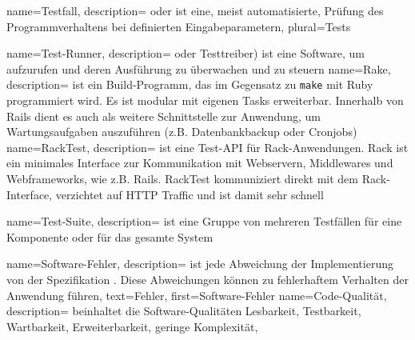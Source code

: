  {
  name={Testfall},
  description= { oder  ist eine, meist automatisierte, Prüfung des Programmverhaltens bei definierten Eingabeparametern},
  plural={Tests}
}

 {
  name={Test-Runner},
  description= {oder Testtreiber) ist eine Software, um  aufzurufen und deren Ausführung zu überwachen und zu steuern}
}
 {
  name={Rake},
  description= {ist ein Build-Programm, das im Gegensatz zu \texttt{make} mit Ruby programmiert wird. Es ist modular mit eigenen Tasks erweiterbar. Innerhalb von Rails dient es auch als weitere Schnittstelle zur Anwendung, um Wartungsaufgaben auszuführen (z.B. Datenbankbackup oder Cronjobs)}
}
 {
  name={RackTest},
  description= { ist eine Test-API für Rack-Anwendungen. Rack ist ein minimales Interface zur Kommunikation mit Webservern, Middlewares und Webframeworks, wie z.B. Rails. RackTest kommuniziert direkt mit dem Rack-Interface, verzichtet auf HTTP Traffic und ist damit sehr schnell}
}

 {
  name={Test-Suite},
  description= {ist eine Gruppe von mehreren Testfällen für eine Komponente oder für das gesamte System}
}

 {
  name={Software-Fehler},
  description= {ist jede Abweichung der Implementierung von der Spezifikation \citep[IEEE/ANSI]{fritzsche_sqm_2005}. Diese Abweichungen können zu fehlerhaftem Verhalten der Anwendung führen},
  text=Fehler,
  first={Software-Fehler}
}
 {
  name={Code-Qualität},
  description= {beinhaltet die Software-Qualitäten Lesbarkeit, Testbarkeit, Wartbarkeit, Erweiterbarkeit, geringe Komplexität},
}

